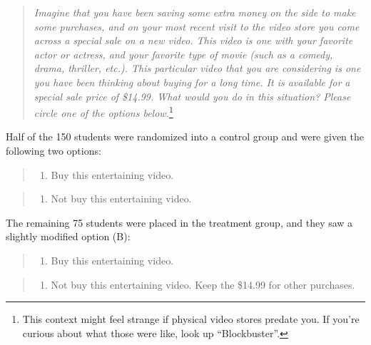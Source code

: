 \documentclass[
  10pt,
  openany]{book}
\providecommand{\tightlist}{%
  \setlength{\itemsep}{0pt}\setlength{\parskip}{0pt}}
\begin{document}
\begin{quote}
\emph{Imagine that you have been saving some extra money on the side to make some purchases, and on your most recent visit to the video store you come across a special sale on a new video. This video is one with your favorite actor or actress, and your favorite type of movie (such as a comedy, drama, thriller, etc.). This particular video that you are considering is one you have been thinking about buying for a long time. It is available for a special sale price of \$14.99. What would you do in this situation? Please circle one of the options below.}\footnote{This context might feel strange if physical video stores predate you.
  If you're curious about what those were like, look up ``Blockbuster''.}
\end{quote}

Half of the 150 students were randomized into a control group and were given the following two options:

\begin{quote}
\begin{enumerate}
\def\labelenumi{(\Alph{enumi})}
\tightlist
\item
  Buy this entertaining video.
\end{enumerate}
\end{quote}

\begin{quote}
\begin{enumerate}
\def\labelenumi{(\Alph{enumi})}
\setcounter{enumi}{1}
\tightlist
\item
  Not buy this entertaining video.
\end{enumerate}
\end{quote}

The remaining 75 students were placed in the treatment group, and they saw a slightly modified option (B):

\begin{quote}
\begin{enumerate}
\def\labelenumi{(\Alph{enumi})}
\tightlist
\item
  Buy this entertaining video.
\end{enumerate}
\end{quote}

\begin{quote}
\begin{enumerate}
\def\labelenumi{(\Alph{enumi})}
\setcounter{enumi}{1}
\tightlist
\item
  Not buy this entertaining video. Keep the \$14.99 for other purchases.
\end{enumerate}
\end{quote}
\end{document}

